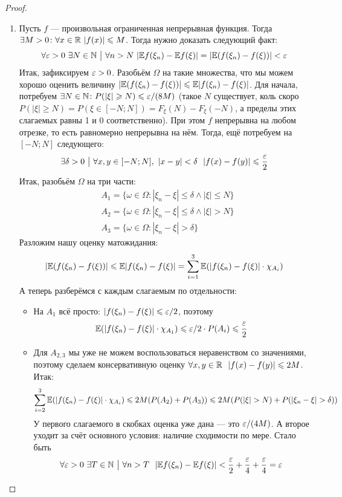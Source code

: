 \begin{proof}
\begin{enumerate}
		\item Пусть $f$ --- произвольная ограниченная непрерывная функция. Тогда $\exists M > 0 \colon \forall x \in \mathbb{R}\ |f(x)| \leqslant M$. Тогда нужно доказать следующий факт:
		\[
			\forall \varepsilon > 0\ \exists N \in \mathbb{N} \ \big|\  \forall n > N\ |\mathbb{E} f(\xi_n) - \mathbb{E} f(\xi)| = |\mathbb{E}(f(\xi_n) - f(\xi))| < \varepsilon
		\]
		Итак, зафиксируем $\varepsilon > 0$. Разобьём $\Omega$ на такие множества, что мы можем хорошо оценить величину $|\mathbb{E}(f(\xi_n) - f(\xi))| \leqslant \mathbb{E}|f(\xi_n) - f(\xi)|$. Для начала, потребуем $\exists N \in \mathbb{N} \colon P(|\xi| \geqslant N) \leqslant \varepsilon / (8M)$ (такое $N$ существует, коль скоро $P(|\xi| \ge N) = P(\xi \in [-N; N]) = F_\xi(N) - F_\xi(-N)$, а пределы этих слагаемых равны 1 и 0 соответственно). При этом $f$ непрерывна на любом отрезке, то есть равномерно непрерывна на нём. Тогда, ещё потребуем на $[-N; N]$ следующего:
		\[
			\exists \delta > 0 \ \big|\  \forall x, y \in [-N; N],\ |x - y| < \delta\ \ |f(x) - f(y)| \leqslant \frac{\varepsilon}{2}
		\]
		Итак, разобьём $\Omega$ на три части:
		\begin{align*}
			&{A_1 = \{\omega \in \Omega \colon |\xi_n - \xi| \le \delta \wedge |\xi| \le N\}}
			\\
			&{A_2 = \{\omega \in \Omega \colon |\xi_n - \xi| \le \delta \wedge |\xi| > N\}}
			\\
			&{A_3 = \{\omega \in \Omega \colon |\xi_n - \xi| > \delta\}}
		\end{align*}
		Разложим нашу оценку матожидания:
		\[
			|\mathbb{E} (f(\xi_n) - f(\xi))| \leqslant \mathbb{E}|f(\xi_n) - f(\xi)| = \sum_{i = 1}^3 \mathbb{E}(|f(\xi_n) - f(\xi)| \cdot \chi_{A_i})
		\]
		А теперь разберёмся с каждым слагаемым по отдельности:
		\begin{itemize}
			\item На $A_1$ всё просто: $|f(\xi_n) - f(\xi)| \leqslant \varepsilon / 2$, поэтому
			\[
				\mathbb{E}(|f(\xi_n) - f(\xi)| \cdot \chi_{A_1}) \leqslant \varepsilon / 2 \cdot P(A_i) \leqslant \frac{\varepsilon}{2}
			\]
			
			\item Для $A_{2, 3}$ мы уже не можем воспользоваться неравенством со значениями, поэтому сделаем консервативную оценку $\forall x, y \in \mathbb{R}\ \ |f(x) - f(y)| \leqslant 2M$. Итак:
			\[
				\sum_{i = 2}^3 \mathbb{E}(|f(\xi_n) - f(\xi)| \cdot \chi_{A_i}) \leqslant 2M(P(A_2) + P(A_3)) \leqslant 2M(P(|\xi| > N) + P(|\xi_n - \xi| > \delta))
			\]
			У первого слагаемого в скобках оценка уже дана --- это $\varepsilon / (4M)$. А второе уходит за счёт основного условия: наличие сходимости по мере. Стало быть
			\[
				\forall \varepsilon > 0\ \exists T \in \mathbb{N} \ \big|\  \forall n > T\ \ |\mathbb{E} f(\xi_n) - \mathbb{E} f(\xi)| < \frac{\varepsilon}{2} + \frac{\varepsilon}{4} + \frac{\varepsilon}{4} = \varepsilon
			\]
		\end{itemize}
	\end{enumerate}
\end{proof}

